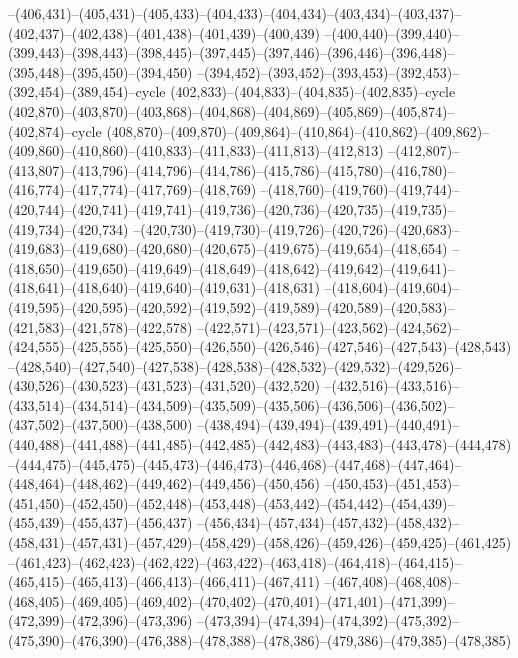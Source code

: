 --(406,431)--(405,431)--(405,433)--(404,433)--(404,434)--(403,434)--(403,437)--(402,437)--(402,438)--(401,438)--(401,439)--(400,439)
--(400,440)--(399,440)--(399,443)--(398,443)--(398,445)--(397,445)--(397,446)--(396,446)--(396,448)--(395,448)--(395,450)--(394,450)
--(394,452)--(393,452)--(393,453)--(392,453)--(392,454)--(389,454)--cycle
(402,833)--(404,833)--(404,835)--(402,835)--cycle
(402,870)--(403,870)--(403,868)--(404,868)--(404,869)--(405,869)--(405,874)--(402,874)--cycle
(408,870)--(409,870)--(409,864)--(410,864)--(410,862)--(409,862)--(409,860)--(410,860)--(410,833)--(411,833)--(411,813)--(412,813)
--(412,807)--(413,807)--(413,796)--(414,796)--(414,786)--(415,786)--(415,780)--(416,780)--(416,774)--(417,774)--(417,769)--(418,769)
--(418,760)--(419,760)--(419,744)--(420,744)--(420,741)--(419,741)--(419,736)--(420,736)--(420,735)--(419,735)--(419,734)--(420,734)
--(420,730)--(419,730)--(419,726)--(420,726)--(420,683)--(419,683)--(419,680)--(420,680)--(420,675)--(419,675)--(419,654)--(418,654)
--(418,650)--(419,650)--(419,649)--(418,649)--(418,642)--(419,642)--(419,641)--(418,641)--(418,640)--(419,640)--(419,631)--(418,631)
--(418,604)--(419,604)--(419,595)--(420,595)--(420,592)--(419,592)--(419,589)--(420,589)--(420,583)--(421,583)--(421,578)--(422,578)
--(422,571)--(423,571)--(423,562)--(424,562)--(424,555)--(425,555)--(425,550)--(426,550)--(426,546)--(427,546)--(427,543)--(428,543)
--(428,540)--(427,540)--(427,538)--(428,538)--(428,532)--(429,532)--(429,526)--(430,526)--(430,523)--(431,523)--(431,520)--(432,520)
--(432,516)--(433,516)--(433,514)--(434,514)--(434,509)--(435,509)--(435,506)--(436,506)--(436,502)--(437,502)--(437,500)--(438,500)
--(438,494)--(439,494)--(439,491)--(440,491)--(440,488)--(441,488)--(441,485)--(442,485)--(442,483)--(443,483)--(443,478)--(444,478)
--(444,475)--(445,475)--(445,473)--(446,473)--(446,468)--(447,468)--(447,464)--(448,464)--(448,462)--(449,462)--(449,456)--(450,456)
--(450,453)--(451,453)--(451,450)--(452,450)--(452,448)--(453,448)--(453,442)--(454,442)--(454,439)--(455,439)--(455,437)--(456,437)
--(456,434)--(457,434)--(457,432)--(458,432)--(458,431)--(457,431)--(457,429)--(458,429)--(458,426)--(459,426)--(459,425)--(461,425)
--(461,423)--(462,423)--(462,422)--(463,422)--(463,418)--(464,418)--(464,415)--(465,415)--(465,413)--(466,413)--(466,411)--(467,411)
--(467,408)--(468,408)--(468,405)--(469,405)--(469,402)--(470,402)--(470,401)--(471,401)--(471,399)--(472,399)--(472,396)--(473,396)
--(473,394)--(474,394)--(474,392)--(475,392)--(475,390)--(476,390)--(476,388)--(478,388)--(478,386)--(479,386)--(479,385)--(478,385)
